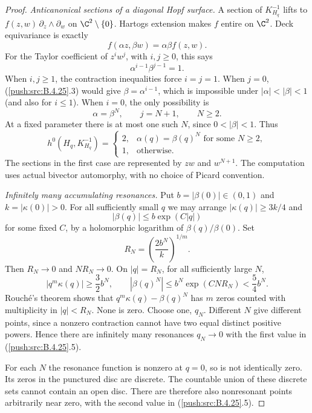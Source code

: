 \begin{proof}
\emph{Anticanonical sections of a diagonal Hopf surface.}
A section of $K_{H_q}^{-1}$ lifts to
$f(z,w)\,\partial_z\wedge\partial_w$ on
$\C^2\setminus\{0\}$. Hartogs extension makes $f$
entire on $\C^2$. Deck equivariance is exactly
\[
 f(\alpha z,\beta w)=\alpha\beta f(z,w).
                                                        \tag{B.4.25.2}
\]
For the Taylor coefficient of $z^i w^j$, with $i,j\ge0$,
this says
\[
 \alpha^{i-1}\beta^{j-1}=1.                             \tag{B.4.25.3}
\]
When $i,j\ge1$, the contraction inequalities force
$i=j=1$. When $j=0$, (\ref{push:src:B.4.25}.3) would give
$\beta=\alpha^{i-1}$, which is impossible under
$|\alpha|<|\beta|<1$ (and also for $i\le1$).
When $i=0$, the only possibility is
\[
 \alpha=\beta^N,\qquad j=N+1,\qquad N\ge2.
                                                        \tag{B.4.25.4}
\]
At a fixed parameter there is at most one such $N$,
since $0<|\beta|<1$. Thus
\[
 h^0(H_q,K_{H_q}^{-1})=
 \begin{cases}
 2,&\alpha(q)=\beta(q)^N\text{ for some }N\ge2,\\
 1,&\text{otherwise}.
 \end{cases}                                           \tag{B.4.25.5}
\]
The sections in the first case are represented by
$zw$ and $w^{N+1}$. The computation uses actual
bivector automorphy, with no choice of Picard convention.

\emph{Infinitely many accumulating resonances.}
Put $b=|\beta(0)|\in(0,1)$ and $k=|\kappa(0)|>0$.
For all sufficiently small $q$ we may arrange
$|\kappa(q)|\ge3k/4$ and
\[
 |\beta(q)|\le b\exp(C|q|)
\]
for some fixed $C$, by a holomorphic logarithm of
$\beta(q)/\beta(0)$. Set
\[
 R_N=\left(\frac{2b^N}{k}\right)^{1/m}.
\]
Then $R_N\to0$ and $N R_N\to0$. On $|q|=R_N$, for
all sufficiently large $N$,
\[
 |q^m\kappa(q)|\ge\frac32 b^N,
 \qquad |\beta(q)^N|\le b^N\exp(CN R_N)<\frac54 b^N.
\]
Rouch\'e's theorem shows that
$q^m\kappa(q)-\beta(q)^N$ has $m$ zeros counted with
multiplicity in $|q|<R_N$. None is zero. Choose one,
$q_N$. Different $N$ give different points, since a
nonzero contraction cannot have two equal distinct
positive powers. Hence there are infinitely many
resonances $q_N\to0$ with the first value in
(\ref{push:src:B.4.25}.5).

For each $N$ the resonance function is nonzero at
$q=0$, so is not identically zero. Its zeros in the
punctured disc are discrete. The countable union of
these discrete sets cannot contain an open disc.
There are therefore also nonresonant points arbitrarily
near zero, with the second value in (\ref{push:src:B.4.25}.5).


\end{proof}
